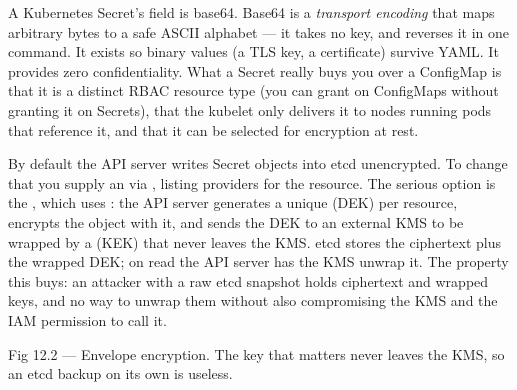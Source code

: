  A Kubernetes Secret's  field is base64. Base64 is a \emph{transport encoding} that maps arbitrary bytes to a safe ASCII alphabet --- it takes no key, and  reverses it in one command. It exists so binary values (a TLS key, a certificate) survive YAML. It provides zero confidentiality. What a Secret really buys you over a ConfigMap is that it is a distinct RBAC resource type (you can grant  on ConfigMaps without granting it on Secrets), that the kubelet only delivers it to nodes running pods that reference it, and that it can be selected for encryption at rest.

 By default the API server writes Secret objects into etcd unencrypted. To change that you supply an  via , listing providers for the  resource. The serious option is the , which uses : the API server generates a unique  (DEK) per resource, encrypts the object with it, and sends the DEK to an external KMS to be wrapped by a  (KEK) that never leaves the KMS. etcd stores the ciphertext plus the wrapped DEK; on read the API server has the KMS unwrap it. The property this buys: an attacker with a raw etcd snapshot holds ciphertext and wrapped keys, and no way to unwrap them without also compromising the KMS and the IAM permission to call it.

\begin{wbfigure}{Fig 12.2 — Envelope encryption. The key that matters never leaves the KMS, so an etcd backup on its own is useless.}
\end{wbfigure}


